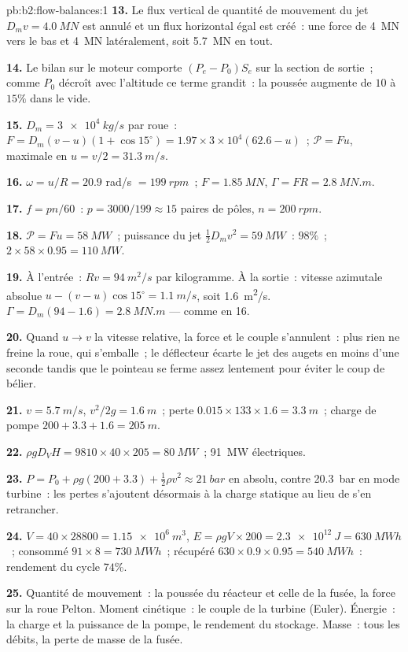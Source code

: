\begin{solution}{pb:b2:flow-balances:1}
\textbf{13.} Le flux vertical de quantité de mouvement du jet $D_mv = \qty{4.0}{MN}$ est
annulé et un flux horizontal égal est créé~: une force de \qty{4}{MN} vers le bas
et \qty{4}{MN} latéralement, soit \qty{5.7}{MN} en tout.

\textbf{14.} Le bilan sur le moteur comporte $(P_e - P_0)S_e$ sur la
section de sortie~; comme $P_0$ décroît avec l'altitude ce terme grandit~: la poussée
augmente de $10$ à $15\%$ dans le vide.

\textbf{15.} $D_m = \qty{3e4}{kg/s}$ par roue~: $F = D_m(v - u)(1 + \cos15^\circ) =
1.97 \times 3 \times 10^4(62.6 - u)$~; $\mathcal P = Fu$, maximale en $u = v/2 = \qty{31.3}{m/s}$.

\textbf{16.} $\omega = u/R = 20.9$ rad/s $= \qty{199}{rpm}$~; $F = \qty{1.85}{MN}$, $\Gamma = FR
= \qty{2.8}{MN.m}$.

\textbf{17.} $f = pn/60$~: $p = 3000/199 \approx 15$ paires de pôles, $n = \qty{200}{rpm}$.

\textbf{18.} $\mathcal P = Fu = \qty{58}{MW}$~; puissance du jet $\tfrac12D_mv^2 = \qty{59}{MW}$~:
$98\%$~; $2 \times 58 \times 0.95 = \qty{110}{MW}$.

\textbf{19.} À l'entrée~: $Rv = \qty{94}{m^2/s}$ par kilogramme. À la sortie~: vitesse azimutale absolue
$u - (v - u)\cos15^\circ = \qty{1.1}{m/s}$, soit \qty{1.6}{m^2/s}. $\Gamma = D_m(94 -
1.6) = \qty{2.8}{MN.m}$ --- comme en 16.

\textbf{20.} Quand $u \to v$ la vitesse relative, la force et le couple
s'annulent~: plus rien ne freine la roue, qui s'emballe~; le déflecteur
écarte le jet des augets en moins d'une seconde tandis que le pointeau
se ferme assez lentement pour éviter le coup de bélier.

\textbf{21.} $v = \qty{5.7}{m/s}$, $v^2/2g = \qty{1.6}{m}$~; perte $0.015 \times 133 \times 1.6 =
\qty{3.3}{m}$~; charge de pompe $200 + 3.3 + 1.6 = \qty{205}{m}$.

\textbf{22.} $\rho gD_VH = 9810 \times 40 \times 205 = \qty{80}{MW}$~; \qty{91}{MW} électriques.

\textbf{23.} $P = P_0 + \rho g(200 + 3.3) + \tfrac12\rho v^2 \approx \qty{21}{bar}$ en absolu,
contre \qty{20.3}{bar} en mode turbine~: les pertes s'ajoutent désormais à la
charge statique au lieu de s'en retrancher.

\textbf{24.} $V = 40 \times 28800 = \qty{1.15e6}{m^3}$, $E = \rho gV \times 200 = \qty{2.3e12}{J}
= \qty{630}{MWh}$~; consommé $91 \times 8 = \qty{730}{MWh}$~; récupéré $630 \times 0.9 \times
0.95 = \qty{540}{MWh}$~: rendement du cycle $74\%$.

\textbf{25.} Quantité de mouvement~: la poussée du réacteur et celle de la fusée, la
force sur la roue Pelton. Moment cinétique~: le couple de la turbine (Euler). Énergie~: la
charge et la puissance de la pompe, le rendement du stockage. Masse~: tous les débits,
la perte de masse de la fusée.
\end{solution}
